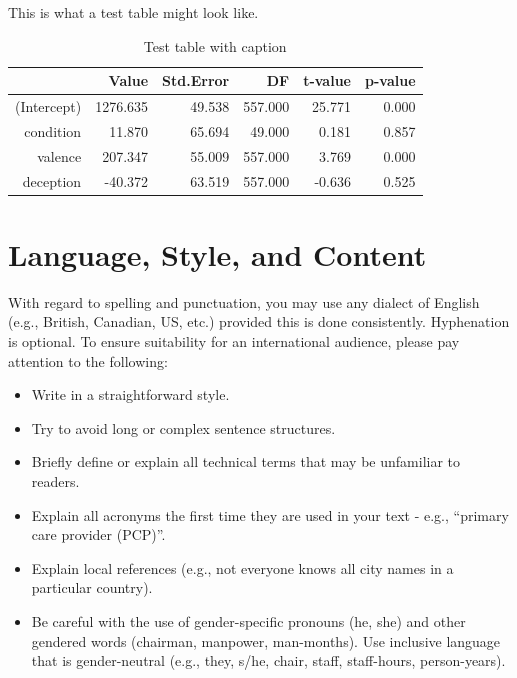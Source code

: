 \documentclass{icis}
\begin{document}
This is what a test table might look like. 

\begin{table}[ht]
\centering
\caption{Test table with caption} 
\label{tab:lme-mean}
\begin{tabular}{rrrrrr}
  \hline
 & Value & Std.Error & DF & t-value & p-value \\ 
  \hline
(Intercept) & 1276.635 & 49.538 & 557.000 & 25.771 & 0.000 \\ 
  condition & 11.870 & 65.694 & 49.000 & 0.181 & 0.857 \\ 
  valence & 207.347 & 55.009 & 557.000 & 3.769 & 0.000 \\ 
  deception & -40.372 & 63.519 & 557.000 & -0.636 & 0.525 \\ 
   \hline
\end{tabular}
\end{table}

\section{Language, Style, and Content}
With regard to spelling and punctuation, you may use any dialect of English
(e.g., British, Canadian, US, etc.) provided this is done
consistently. Hyphenation is optional. To ensure suitability for an
international audience, please pay attention to the following:

\begin{itemize}
\item Write in a straightforward style.
\item Try to avoid long or complex sentence structures.
\item Briefly define or explain all technical terms that may be unfamiliar to
  readers.
\item Explain all acronyms the first time they are used in your text - e.g.,
  ``primary care provider (PCP)''.
\item Explain local references (e.g., not everyone knows all city names in a
  particular country).
\item Be careful with the use of gender-specific pronouns (he, she) and other
  gendered words (chairman, manpower, man-months). Use inclusive language that
  is gender-neutral (e.g., they, s/he, chair, staff, staff-hours, person-years).
\end{itemize}
\end{document}
